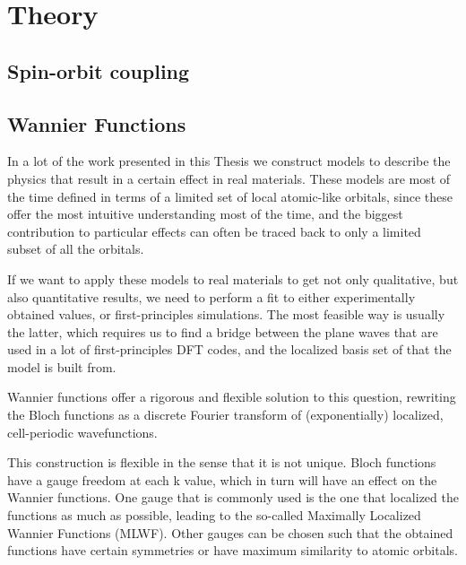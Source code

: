\chapter{Theory}
\section{Spin-orbit coupling}
\section{Wannier Functions}

	In a lot of the work presented in this Thesis we construct models to describe the physics that result in a certain effect in real materials.
	These models are most of the time defined in terms of a limited set of local atomic-like orbitals, since these offer the most intuitive understanding most of the time, and the biggest contribution to particular effects can often be traced back to only a limited subset of all the orbitals.

	If we want to apply these models to real materials to get not only qualitative, but also quantitative results, we need to perform a fit to either experimentally obtained values, or first-principles simulations.
	The most feasible way is usually the latter, which requires us to find a bridge between the plane waves that are used in a lot of first-principles DFT codes, and the localized basis set of that the model is built from.

	Wannier functions offer a rigorous and flexible solution to this question, rewriting the Bloch functions as a discrete Fourier transform of (exponentially) localized, cell-periodic wavefunctions.

	This construction is flexible in the sense that it is not unique. Bloch functions have a gauge freedom at each k value, which in turn will have an effect on the Wannier functions.
	One gauge that is commonly used is the one that localized the functions as much as possible, leading to the so-called Maximally Localized Wannier Functions (MLWF).
	Other gauges can be chosen such that the obtained functions have certain symmetries or have maximum similarity to atomic orbitals.


